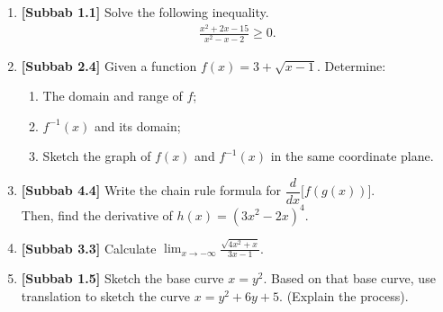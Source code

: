 \documentclass[10pt,openany,a4paper]{article}
\theoremstyle{definition}
\theoremstyle{definition}
\theoremstyle{plain}
\begin{document}
\begin{enumerate}
    \item \textbf{[Subbab 1.1]} Solve the following inequality.
    \begin{align*}
        \frac{x^2+2x-15}{x^2-x-2}\geq 0.
    \end{align*}

    \item \textbf{[Subbab 2.4]} Given a function $f(x)=3+\sqrt{x-1}$. Determine:
    \begin{enumerate}
        \item[a)] The domain and range of $f$;
        \item[b)] $f^{-1}(x)$ and its domain;
        \item[c)] Sketch the graph of $f(x)$ and $f^{-1}(x)$ in the same coordinate plane.
    \end{enumerate}

    \item \textbf{[Subbab 4.4]} Write the chain rule formula for $\dfrac{d}{dx}\big[f(g(x))\big]$.\\
    Then, find the derivative of $h(x)=\left(3x^2-2x\right)^4$.

    \item \textbf{[Subbab 3.3]} Calculate $\displaystyle\lim_{x\to-\infty}\frac{\sqrt{4x^2+x}}{3x-1}$.

    \item \textbf{[Subbab 1.5]} Sketch the base curve $x=y^2$. Based on that base curve, use translation to sketch the curve $x=y^2+6y+5$. (Explain the process).
\end{enumerate}

\newpage
\end{document}
